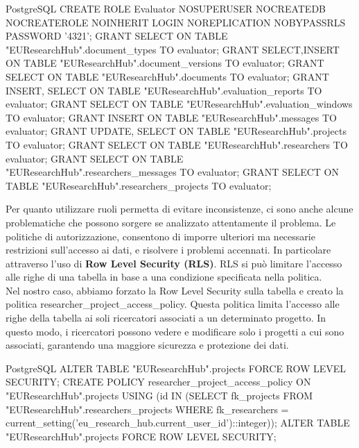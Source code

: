 \documentclass{report}
\begin{document}
\begin{imtaCode}{PostgreSQL}
CREATE ROLE Evaluator NOSUPERUSER NOCREATEDB NOCREATEROLE NOINHERIT LOGIN NOREPLICATION NOBYPASSRLS PASSWORD '4321';
GRANT SELECT ON TABLE "EUResearchHub".document_types TO evaluator;
GRANT SELECT,INSERT ON TABLE "EUResearchHub".document_versions TO evaluator;
GRANT SELECT ON TABLE "EUResearchHub".documents TO evaluator;
GRANT INSERT, SELECT ON TABLE "EUResearchHub".evaluation_reports TO evaluator;
GRANT SELECT ON TABLE "EUResearchHub".evaluation_windows TO evaluator;
GRANT INSERT ON TABLE "EUResearchHub".messages TO evaluator;
GRANT UPDATE, SELECT ON TABLE "EUResearchHub".projects TO evaluator;
GRANT SELECT ON TABLE "EUResearchHub".researchers TO evaluator;
GRANT SELECT ON TABLE "EUResearchHub".researchers_messages TO evaluator;
GRANT SELECT ON TABLE "EUResearchHub".researchers_projects TO evaluator;
\end{imtaCode}
Per quanto utilizzare ruoli permetta di evitare inconsistenze, ci sono anche alcune problematiche che possono sorgere se analizzato attentamente il problema. 
Le politiche di autorizzazione, consentono di imporre ulteriori ma necessarie restrizioni sull'accesso ai dati, e risolvere i problemi accennati. In particolare attraverso l'uso di \textbf{Row Level Security (RLS)}. RLS si può limitare l'accesso alle righe di una tabella in base a una condizione specificata nella politica.\\
Nel nostro caso, abbiamo forzato la Row Level Security sulla tabella  e creato la politica researcher\_project\_access\_policy. Questa politica limita l'accesso alle righe della tabella  ai soli ricercatori associati a un determinato progetto. In questo modo, i ricercatori possono vedere e modificare solo i progetti a cui sono associati, garantendo una maggiore sicurezza e protezione dei dati.
\begin{imtaCode}{PostgreSQL}
ALTER TABLE "EUResearchHub".projects FORCE ROW LEVEL SECURITY;
CREATE POLICY researcher_project_access_policy
  ON "EUResearchHub".projects
  USING (id IN (SELECT fk_projects FROM "EUResearchHub".researchers_projects WHERE fk_researchers = current_setting('eu_research_hub.current_user_id')::integer));
ALTER TABLE "EUResearchHub".projects FORCE ROW LEVEL SECURITY;
\end{imtaCode}
\end{document}
